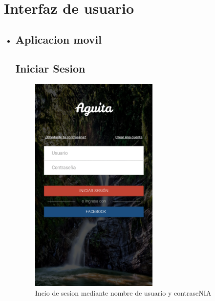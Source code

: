 	\section{Interfaz de usuario}
		\begin{itemize}
			\item \subsection{Aplicacion movil}
			
				\subsection{Iniciar Sesion}
					\begin{figure}[H]
						\centering
							\includegraphics[width=0.6\textwidth]{Screenshots/login.png}
									\caption{Incio de sesion mediante nombre de usuario y contraseNIA}
							\label{fig:login}
					\end{figure}


\end{itemize}
